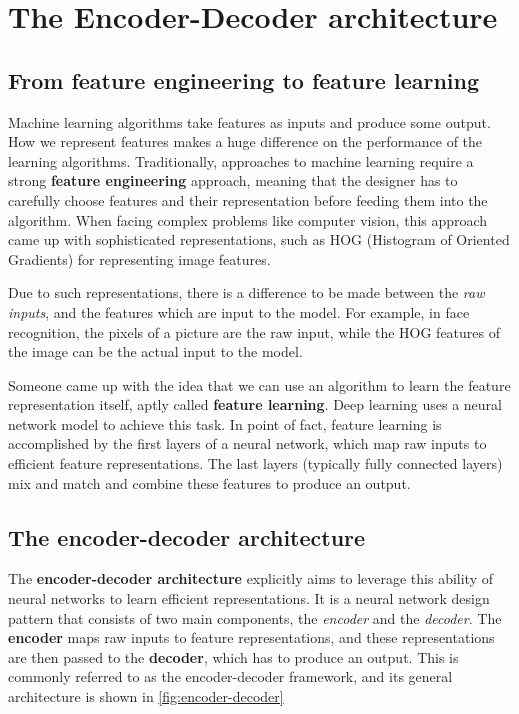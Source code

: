 \section{The Encoder-Decoder architecture}\label{sec:encoder-decoder}

\subsection{From feature engineering to feature learning}

Machine learning algorithms take features as inputs and produce some output. How we represent features makes a huge difference on the performance of the learning algorithms.  Traditionally, approaches to machine learning require a strong \textbf{feature engineering} approach, meaning that the designer has to carefully choose features and their representation before feeding them into the algorithm. When facing complex problems like computer vision, this approach came up with sophisticated representations, such as HOG (Histogram of Oriented Gradients) for representing image features.

Due to such representations, there is a difference to be made between the \textit{raw inputs}, and the features which are input to the model. For example, in face recognition, the pixels of a picture are the raw input, while the HOG features of the image can be the actual input to the model.

Someone came up with the idea that we can use an algorithm to learn the feature representation itself, aptly called \textbf{feature learning}. Deep learning uses a neural network model to achieve this task. In point of fact, feature learning is accomplished by the first layers of a neural network, which map raw inputs to efficient feature representations. The last layers (typically fully connected layers) mix and match and combine these features to produce an output.

\subsection{The encoder-decoder architecture}

The \textbf{encoder-decoder architecture} explicitly aims to leverage this ability of neural networks to learn efficient representations. It is a neural network design pattern that consists of two main components, the \textit{encoder} and the \textit{decoder}.  The \textbf{encoder} maps raw inputs to feature representations, and these representations are then passed to the \textbf{decoder}, which has to produce an output. This is commonly referred to as the encoder-decoder framework, and its general architecture is shown in \cref{fig:encoder-decoder}

